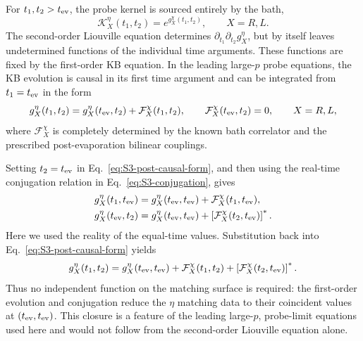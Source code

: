 \documentclass[11pt,a4paper]{article}
\begin{document}
For \(t_1,t_2>t_{\rm ev}\), the probe kernel is sourced entirely by the bath,
\begin{equation}
\mathcal K^\eta_X(t_1,t_2)
=
e^{g^\chi_X(t_1,t_2)},
\qquad
X=R,L .
\end{equation}
The second-order Liouville equation determines
\(\partial_{t_1}\partial_{t_2}g^\eta_X\), but by itself leaves undetermined
functions of the individual time arguments. These functions are fixed by the
first-order KB equation. In the leading large-\(p\) probe equations, the KB
evolution is causal in its first time argument and can be integrated from
\(t_1=t_{\rm ev}\) in the form
\begin{equation}
g^\eta_X(t_1,t_2)
=
g^\eta_X(t_{\rm ev},t_2)
+
\mathcal F^\chi_X(t_1,t_2),
\qquad
\mathcal F^\chi_X(t_{\rm ev},t_2)=0 ,
\qquad
X=R,L ,
\label{eq:S3-post-causal-form}
\end{equation}
where \(\mathcal F^\chi_X\) is completely determined by the known bath
correlator and the prescribed post-evaporation bilinear couplings.

Setting \(t_2=t_{\rm ev}\) in
Eq.~\eqref{eq:S3-post-causal-form}, and then using the real-time conjugation
relation in Eq.~\eqref{eq:S3-conjugation}, gives
\begin{equation}
\begin{aligned}
g^\eta_X(t_1,t_{\rm ev})
&=
g^\eta_X(t_{\rm ev},t_{\rm ev})
+
\mathcal F^\chi_X(t_1,t_{\rm ev}),
\\
g^\eta_X(t_{\rm ev},t_2)
&=
g^\eta_X(t_{\rm ev},t_{\rm ev})
+
\left[
\mathcal F^\chi_X(t_2,t_{\rm ev})
\right]^* .
\end{aligned}
\label{eq:S3-post-boundary-data}
\end{equation}
Here we used the reality of the equal-time values. Substitution back into
Eq.~\eqref{eq:S3-post-causal-form} yields
\begin{equation}
g^\eta_X(t_1,t_2)
=
g^\eta_X(t_{\rm ev},t_{\rm ev})
+
\mathcal F^\chi_X(t_1,t_2)
+
\left[
\mathcal F^\chi_X(t_2,t_{\rm ev})
\right]^* .
\label{eq:S3-post-causal-closure}
\end{equation}
Thus no independent function on the matching surface is required: the
first-order evolution and conjugation reduce the \(\eta\) matching data to
their coincident values at \((t_{\rm ev},t_{\rm ev})\). This closure is a
feature of the leading large-\(p\), probe-limit equations used here and would
not follow from the second-order Liouville equation alone.
\end{document}
